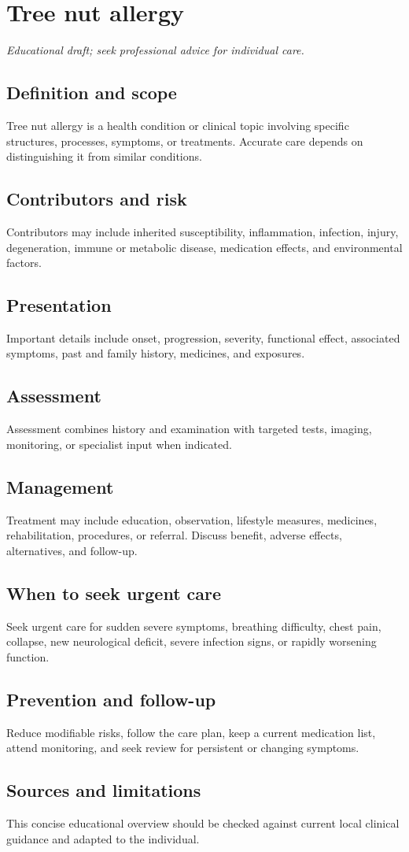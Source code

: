 \chapter{Tree nut allergy}
\medskip
\noindent\textit{Educational draft; seek professional advice for individual care.}

\section*{Definition and scope}
Tree nut allergy is a health condition or clinical topic involving specific structures, processes, symptoms, or treatments. Accurate care depends on distinguishing it from similar conditions.

\section*{Contributors and risk}
Contributors may include inherited susceptibility, inflammation, infection, injury, degeneration, immune or metabolic disease, medication effects, and environmental factors.

\section*{Presentation}
Important details include onset, progression, severity, functional effect, associated symptoms, past and family history, medicines, and exposures.

\section*{Assessment}
Assessment combines history and examination with targeted tests, imaging, monitoring, or specialist input when indicated.

\section*{Management}
Treatment may include education, observation, lifestyle measures, medicines, rehabilitation, procedures, or referral. Discuss benefit, adverse effects, alternatives, and follow-up.

\section*{When to seek urgent care}
Seek urgent care for sudden severe symptoms, breathing difficulty, chest pain, collapse, new neurological deficit, severe infection signs, or rapidly worsening function.

\section*{Prevention and follow-up}
Reduce modifiable risks, follow the care plan, keep a current medication list, attend monitoring, and seek review for persistent or changing symptoms.

\section*{Sources and limitations}
This concise educational overview should be checked against current local clinical guidance and adapted to the individual.
